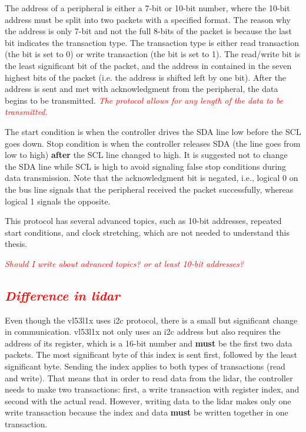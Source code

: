 \documentclass[
  digital,     %
  oneside,     %
  nosansbold,  %
  nocolorbold, %
  lof,         %
  lot,         %
]{fithesis4}
\newcommand{\TODO}[1]{\textcolor{red}{\textit{#1}}}
\begin{document}
The address of a peripheral is either a 7-bit or 10-bit number, where the 10-bit address must be split into two packets with a specified format. The reason why the address is only 7-bit and not the full 8-bits of the packet is because the last bit indicates the transaction type. The transaction type is either read transaction (the bit is set to 0) or write transaction (the bit is set to 1). The read/write bit is the least significant bit of the packet, and the address in contained in the seven highest bits of the packet (i.e. the address is shifted left by one bit). After the address is sent and met with acknowledgment from the peripheral, the data begins to be transmitted. \TODO{The protocol allows for any length of the data to be transmitted.}

The start condition is when the controller drives the SDA line low before the SCL goes down. Stop condition is when the controller releases SDA (the line goes from low to high) \textbf{after} the SCL line changed to high. It is suggested not to change the SDA line while SCL is high to avoid signaling false stop conditions during data transmission. Note that the acknowledgment bit is negated, i.e., logical 0 on the bus line signals that the peripheral received the packet successfully, whereas logical 1 signals the opposite.

This protocol has several advanced topics, such as 10-bit addresses, repeated start conditions, and clock stretching, which are not needed to understand this thesis.

\TODO{Should I write about advanced topics? or at least 10-bit addresses?}

\subsection{ \TODO{Difference in lidar} } \label{sec:lidar-i2c}
Even though the \gls{vl53l1x} uses \acrshort{i2c} protocol, there is a small but significant change in communication. \gls{vl53l1x} not only uses an \acrshort{i2c} address but also requires the address of its register, which is a 16-bit number and \textbf{must} be the first two data packets. The most significant byte of this index is sent first, followed by the least significant byte. Sending the index applies to both types of transactions (read and write). That means that in order to read data from the \acrshort{lidar}, the controller needs to make two transactions: first, a write transaction with register index, and second with the actual read. However, writing data to the \acrshort{lidar} makes only one write transaction because the index and data \textbf{must} be written together in one transaction.
\end{document}
